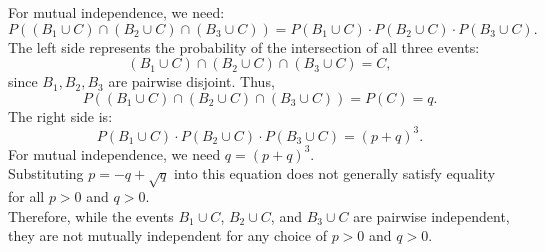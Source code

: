 \begin{solution}
    For mutual independence, we need:
    \[
    P((B_1 \cup C) \cap (B_2 \cup C) \cap (B_3 \cup C)) = P(B_1 \cup C) \cdot P(B_2 \cup C) \cdot P(B_3 \cup C).
    \]
    The left side represents the probability of the intersection of all three events:
    \[
    (B_1 \cup C) \cap (B_2 \cup C) \cap (B_3 \cup C) = C,
    \]
    since \( B_1, B_2, B_3 \) are pairwise disjoint. Thus,
    \[
    P((B_1 \cup C) \cap (B_2 \cup C) \cap (B_3 \cup C)) = P(C) = q.
    \]
    The right side is:
    \[
    P(B_1 \cup C) \cdot P(B_2 \cup C) \cdot P(B_3 \cup C) = (p + q)^3.
    \]
    For mutual independence, we need \( q = (p + q)^3 \).\\
    
    Substituting \( p = -q + \sqrt{q} \) into this equation does not generally satisfy equality for all \( p > 0 \) and \( q > 0 \). \\
    
    Therefore, while the events \( B_1 \cup C \), \( B_2 \cup C \), and \( B_3 \cup C \) are pairwise independent, they are not mutually independent for any choice of \( p > 0 \) and \( q > 0 \).    
\end{solution}